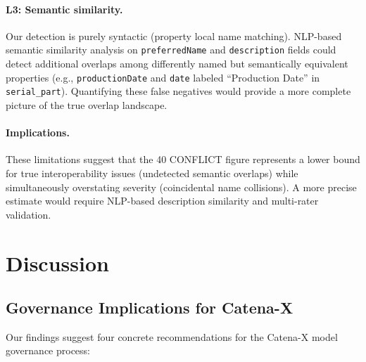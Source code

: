 \documentclass[]{ceurart}
\begin{document}
\paragraph{L3: Semantic similarity.}
Our detection is purely syntactic (property local name matching).
NLP-based semantic similarity analysis on \texttt{preferredName} and
\texttt{description} fields could detect additional overlaps among
differently named but semantically equivalent properties (e.g.,
\texttt{productionDate} and \texttt{date} labeled ``Production Date'' in
\texttt{serial\_part}). Quantifying these false negatives would provide a
more complete picture of the true overlap landscape.

\paragraph{Implications.}
These limitations suggest that the 40 CONFLICT figure represents a lower
bound for true interoperability issues (undetected semantic overlaps)
while simultaneously overstating severity (coincidental name collisions).
A more precise estimate would require NLP-based description similarity
and multi-rater validation.

\section{Discussion}\label{sec:discussion}

\subsection{Governance Implications for Catena-X}

Our findings suggest four concrete recommendations for the Catena-X
model governance process:
\end{document}
